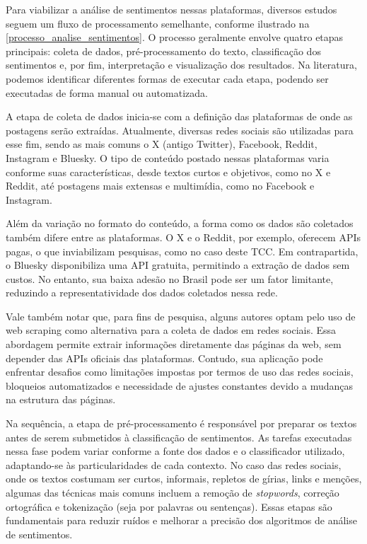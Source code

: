 \documentclass[
	12pt,				%
	oneside,			%
	a4paper,			%
	english,			%
	french,				%
	spanish,			%
	brazil				%
	]{abntex2}
\begin{document}
Para viabilizar a análise de sentimentos nessas plataformas, diversos
estudos seguem um fluxo de processamento semelhante, conforme ilustrado
na \autoref{processo_analise_sentimentos}. O processo geralmente envolve
quatro etapas principais: coleta de dados, pré-processamento do texto,
classificação dos sentimentos e, por fim, interpretação e visualização
dos resultados. Na literatura, podemos identificar diferentes formas de
executar cada etapa, podendo ser executadas de forma manual ou
automatizada.

A etapa de coleta de dados inicia-se com a definição das plataformas de
onde as postagens serão extraídas. Atualmente, diversas redes sociais
são utilizadas para esse fim, sendo as mais comuns o X (antigo Twitter),
Facebook, Reddit, Instagram e Bluesky. O tipo de conteúdo postado nessas
plataformas varia conforme suas características, desde textos curtos e
objetivos, como no X e Reddit, até postagens mais extensas e multimídia,
como no Facebook e Instagram.

Além da variação no formato do conteúdo, a forma como os dados são
coletados também difere entre as plataformas. O X e o Reddit, por
exemplo, oferecem APIs pagas, o que inviabilizam pesquisas, como no caso
deste TCC. Em contrapartida, o Bluesky disponibiliza uma API gratuita,
permitindo a extração de dados sem custos. No entanto, sua baixa adesão
no Brasil pode ser um fator limitante, reduzindo a representatividade
dos dados coletados nessa rede.

Vale também notar que, para fins de pesquisa, alguns autores optam pelo
uso de web scraping como alternativa para a coleta de dados em redes
sociais. Essa abordagem permite extrair informações diretamente das
páginas da web, sem depender das APIs oficiais das plataformas. Contudo,
sua aplicação pode enfrentar desafios como limitações impostas por
termos de uso das redes sociais, bloqueios automatizados e necessidade
de ajustes constantes devido a mudanças na estrutura das páginas.

Na sequência, a etapa de pré-processamento é responsável por preparar os
textos antes de serem submetidos à classificação de sentimentos. As
tarefas executadas nessa fase podem variar conforme a fonte dos dados e
o classificador utilizado, adaptando-se às particularidades de cada
contexto. No caso das redes sociais, onde os textos costumam ser curtos,
informais, repletos de gírias, links e menções, algumas das técnicas
mais comuns incluem a remoção de \emph{stopwords}, correção ortográfica
e tokenização (seja por palavras ou sentenças). Essas etapas são
fundamentais para reduzir ruídos e melhorar a precisão dos algoritmos de
análise de sentimentos.
\end{document}
